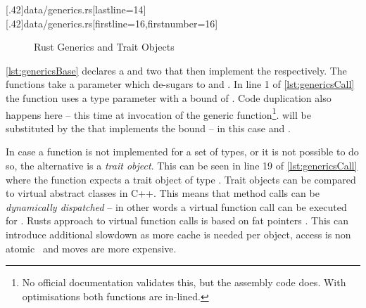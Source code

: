 \documentclass[thesis]{subfiles}
\begin{document}
    \LstTikzBox{\genericsBase}[.42\linewidth]{data/generics.rs}[lastline=14]
    \LstTikzBox{\genericsCall}[.42\linewidth]{data/generics.rs}[firstline=16,firstnumber=16]
    \begin{figure}[ht]
      \captionsetup{type=lstlisting}
       \hfill%
      \caption{Rust Generics and Trait Objects}\label{lst:generics}
    \end{figure}

    \autoref{lst:genericsBase} declares a \trait and two \structs that then implement the \trait respectively.
    The functions  take a parameter  which de-sugars to  and .
    In line 1 of \autoref{lst:genericsCall} the function  uses a type parameter \T with a bound of .
    Code duplication also happens here -- this time at invocation of the generic function\footnote{
      No official documentation validates this, but the assembly code does. With optimisations both functions are in-lined.
    }.
    \T will be substituted by the \struct that implements the bound -- in this case  and .

    In case a function is not implemented for a set of types, or it is not possible to do so, the alternative is a \emph{trait object}\autocite[17. Object Oriented Programming Features of Rust]{rust-book}.
    This can be seen in line 19 of \autoref{lst:genericsCall} where the function expects a trait object of type .
    Trait objects can be compared to virtual abstract classes in C++.
    This means that method calls can be \emph{dynamically dispatched} -- in other words a virtual function call can be executed for .
    Rusts approach to virtual function calls is based on fat pointers \autocites[Trait Objects]{rust-book1}[std::raw::TraitObject]{rust-doc}.
    This can introduce additional slowdown as more cache is needed per object, access is non atomic~\autocite[8.2.3.1 ff.]{intel64and} and moves are more expensive.
\end{document}
